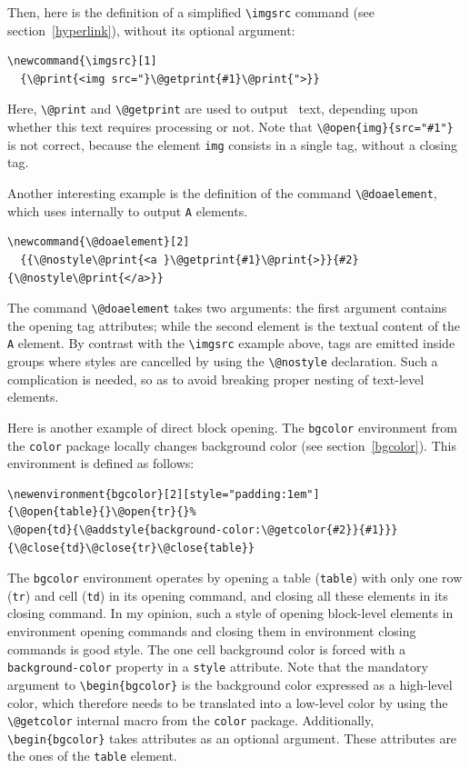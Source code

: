 Then, here is the definition of a simplified \verb+\imgsrc+
command (see section~\ref{hyperlink}), without its optional argument:
\begin{verbatim}
\newcommand{\imgsrc}[1]
  {\@print{<img src="}\@getprint{#1}\@print{">}}
\end{verbatim}
Here, \verb+\@print+ and \verb+\@getprint+ are used to output
\html~text, depending upon whether this text requires processing or not.
Note that \verb+\@open{img}{src="#1"}+ is not correct,
because the element \verb+img+ consists in a single tag, without a
closing tag.

Another interesting example is the definition of the command
\verb+\@doaelement+,
which \hevea{} uses internally to output \texttt{A} elements.
\begin{verbatim}
\newcommand{\@doaelement}[2]
  {{\@nostyle\@print{<a }\@getprint{#1}\@print{>}}{#2}{\@nostyle\@print{</a>}}
\end{verbatim}
The command \verb+\@doaelement+ takes two arguments: the first
argument contains the opening tag attributes; while the second element is
the textual content of the \verb+A+ element.
By contrast with the \verb+\imgsrc+ example above,
tags are emitted inside groups where styles are cancelled by using the
\verb+\@nostyle+ declaration.
Such a complication is needed, so as to avoid breaking proper nesting
of text-level elements.

\label{getcolor:usage}
Here is another example of direct block opening.
The \texttt{bgcolor} environment from the \texttt{color} package
locally changes background color (see section~\ref{bgcolor}).
This environment is defined as follows:
\begin{verbatim}
\newenvironment{bgcolor}[2][style="padding:1em"]
{\@open{table}{}\@open{tr}{}%
\@open{td}{\@addstyle{background-color:\@getcolor{#2}}{#1}}}
{\@close{td}\@close{tr}\@close{table}}
\end{verbatim}
The \texttt{bgcolor} environment operates by opening a \html{} table
(\verb+table+) with only one row (\verb+tr+) and cell (\verb+td+) in
its opening command, and closing all these elements in its closing
command. In my opinion, such a style of opening block-level elements
in environment opening commands and closing them in environment
closing commands is good style.
%
The one cell background color is forced with a \verb+background-color+
property in a \verb+style+ attribute.
Note that the mandatory argument to \verb+\begin{bgcolor}+ is the
background color expressed as a high-level color, which therefore
needs to be translated into a low-level color by using the
\verb+\@getcolor+ internal macro from the \texttt{color} package.
Additionally,  \verb+\begin{bgcolor}+ takes \html{} attributes
as an optional argument. These attributes are the ones of the
\verb+table+ element.

